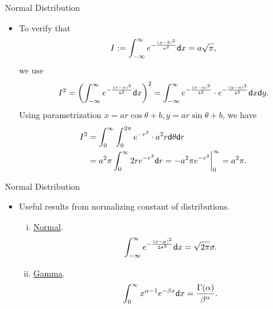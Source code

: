 \begin{frame}{Normal Distribution}

\begin{itemize}
	\justifying
	\item To verify that
	\begin{align*}
	I := \int_{-\infty}^{\infty} e^{-\frac{(x-b)^2}{a^2}}\mathsf{d}x = a\sqrt{\pi},
	\end{align*}
	we use
	\begin{align*}
	I^2 = \left(\int_{-\infty}^{\infty} e^{-\frac{(x-a)^2}{b^2}}\mathsf{d}x \right)^2 = \int_{-\infty}^{\infty} e^{-\frac{(x-a)^2}{b^2}}\cdot e^{-\frac{(y-a)^2}{b^2}} \mathsf{d}x\mathsf{d}y.
	\end{align*}
	Using parametrization $x = ar\cos\theta + b, y = ar\sin\theta + b$, we have
	\begin{align*}
	I^2 & = \int_0^{\infty}\int_{0}^{2\pi} e^{-r^2} \cdot a^2r\mathsf{d}\theta \mathsf{d}r \\
	& = a^2\pi \int_{0}^{\infty} 2r e^{-r^2}\mathsf{d}r = -a^2\pi e^{-r^2}\bigg|_0^{\infty} = a^2\pi.
	\end{align*}
\end{itemize}

\end{frame}


\begin{frame}{Normal Distribution}

\begin{itemize}
	\justifying
	\item Useful results from normalizing constant of distributions.
	\begin{enumerate}[(i).]
		\item \underline{Normal}.
		\begin{align*}
		\int_{-\infty}^{\infty} e^{-\frac{(x-\mu)^2}{2\sigma^2}}\mathsf{d}x = \sqrt{2\pi}\sigma.
		\end{align*}
		\item \underline{Gamma}.
		\begin{align*}
		\int_0^{\infty} x^{\alpha-1} e^{-\beta x}\mathsf{d}x = \frac{\Gamma(\alpha)}{\beta^{\alpha}}.
		\end{align*}
	\end{enumerate}
\end{itemize}

\end{frame}


